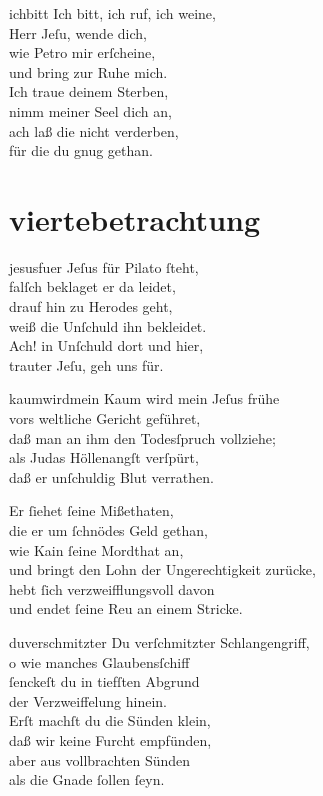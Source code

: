 \documentclass[abbrwidth=6em,tocstyle=ref-genre,shorttitlesize=50]{ees}
\begin{document}
{\begin{movement}{ichbitt}
  \voice[Coro]
  Ich bitt, ich ruf, ich weine,\\
  Herr Jeſu, wende dich,\\
  wie Petro mir erſcheine,\\
  und bring zur Ruhe mich.\\
  Ich traue deinem Sterben,\\
  nimm meiner Seel dich an,\\
  ach laß die nicht verderben,\\
  für die du gnug gethan.
\end{movement}

\part{viertebetrachtung}

\begin{movement}{jesusfuer}
  \voice[Coro]
  Jeſus für Pilato ſteht,\\
  falſch beklaget er da leidet,\\
  drauf hin zu Herodes geht,\\
  weiß die Unſchuld ihn bekleidet.\\
  Ach! in Unſchuld dort und hier,\\
  trauter Jeſu, geh uns für.
\end{movement}

\begin{movement}{kaumwirdmein}
  \voice[Soprano]
  Kaum wird mein Jeſus frühe\\
  vors weltliche Gericht geführet,\\
  daß man an ihm den Todesſpruch vollziehe;\\
  als Judas Höllenangſt verſpürt,\\
  daß er unſchuldig Blut verrathen.

  \voice[Basso]
  Er ſiehet ſeine Mißethaten,\\
  die er um ſchnödes Geld gethan,\\
  wie Kain ſeine Mordthat an,\\
  und bringt den Lohn der Ungerechtigkeit zurücke,\\
  hebt ſich verzweifflungsvoll davon\\
  und endet ſeine Reu an einem Stricke.
\end{movement}

\begin{movement}{duverschmitzter}
  Du verſchmitzter Schlangengriff,\\
  o wie manches Glaubensſchiff\\
  ſenckeſt du in tiefſten Abgrund\\
  der Verzweiffelung hinein.\\
  Erſt machſt du die Sünden klein,\\
  daß wir keine Furcht empfünden,\\
  aber aus vollbrachten Sünden\\
  als die Gnade ſollen ſeyn.
\end{movement}

}
\end{document}
